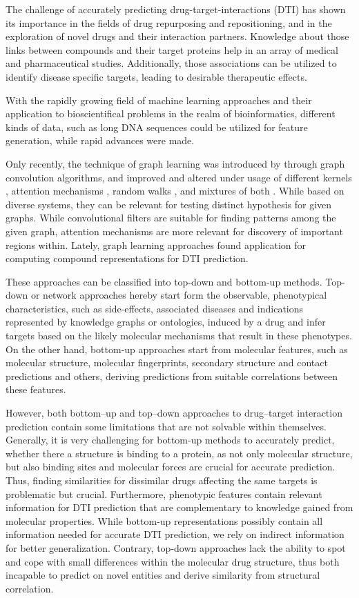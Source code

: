\documentclass{bioinfo}
\renewcommand{\cite}{\citep}
\begin{document}
The challenge of accurately predicting drug-target-interactions (DTI)
has shown its importance in the fields of drug repurposing and
repositioning, and in the exploration of novel drugs and their
interaction partners. Knowledge about those links between compounds
and their target proteins help in an array of medical and
pharmaceutical studies. Additionally, those associations can be
utilized to identify disease specific targets, leading to desirable
therapeutic effects.

With the rapidly growing field of machine learning approaches and
their application to bioscientifical problems in the realm of
bioinformatics, different kinds of data, such as long DNA sequences
could be utilized for feature generation, while rapid advances were
made. 

Only recently, the technique of graph learning was introduced by
\citet{GCNConv} through graph convolution algorithms, and improved and
altered under usage of different kernels \cite{ChebConv, ARMAConv},
attention mechanisms \cite{GATConv}, random walks \cite{APPNPConv},
and mixtures of both \cite{SAGEConv}. While based on diverse systems,
they can be relevant for testing distinct hypothesis for given
graphs. While convolutional filters are suitable for finding patterns
among the given graph, attention mechanisms are more relevant for
discovery of important regions within. Lately, graph learning
approaches found application for computing compound representations
for DTI prediction.

These approaches can be classified into top-down and bottom-up methods. Top-down or network approaches hereby start form the observable, phenotypical characteristics, such as side-effects, associated diseases and indications represented by knowledge graphs or ontologies, induced by a drug and infer targets based on the likely molecular mechanisms that result in these phenotypes. On the other hand, bottom-up approaches start from molecular features, such as molecular structure, molecular fingerprints, secondary structure and contact predictions and others, deriving predictions from suitable correlations between these features. 

However, both bottom--up and top--down approaches to drug--target interaction prediction contain some limitations that are not solvable within themselves. Generally, it is very challenging for bottom-up methods to accurately predict, whether there a structure is binding to a protein, as not only molecular structure, but also binding sites and molecular forces are crucial for accurate prediction. Thus, finding similarities for dissimilar drugs affecting the same targets is problematic but crucial. Furthermore, phenotypic features contain relevant information for DTI prediction \cite{Campillos2008} that are complementary to knowledge gained from molecular properties. While bottom-up representations possibly contain all information needed for accurate DTI prediction, we rely on indirect information for better generalization. Contrary, top-down approaches lack the ability to spot and cope with small differences within the molecular drug structure, thus both incapable to predict on novel entities and derive similarity from structural correlation.
\end{document}
